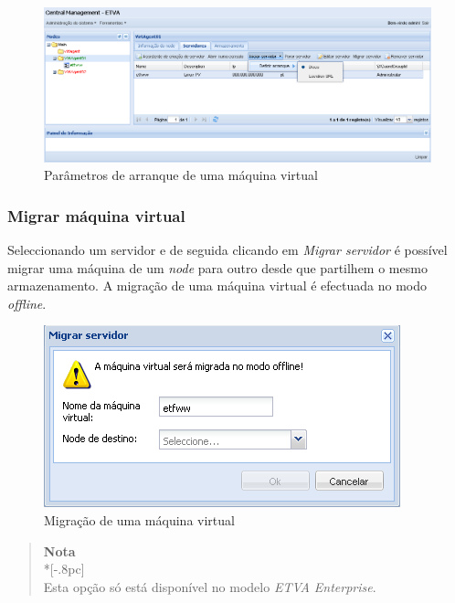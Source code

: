 \begin{figure}[H]
	\begin{center}
	\includegraphics[scale=0.45]{screenshots/server_start.png}
	\caption{Parâmetros de arranque de uma máquina virtual}
	\label{fig:server_start}
	\end{center}
\end{figure}


\subsubsection{Migrar máquina virtual}
\label{sec:migrate_server}

Seleccionando um servidor e de seguida clicando em \emph{Migrar servidor} é possível migrar uma máquina de um \emph{node} para outro desde que partilhem o mesmo armazenamento.
A migração de uma máquina virtual é efectuada no modo \emph{offline}.

\begin{figure}[H]
	\begin{center}
	\includegraphics[scale=0.5]{screenshots/server_migrate.png}
	\caption{Migração de uma máquina virtual}
	\label{fig:server_migrate}
	\end{center}
\end{figure}

\begin{quote}
	{\large \bf Nota} \\*[-.8pc]
	\underline{\hspace{6in}} \\
	Esta opção só está disponível no modelo \emph{ETVA Enterprise}.
\end{quote}


